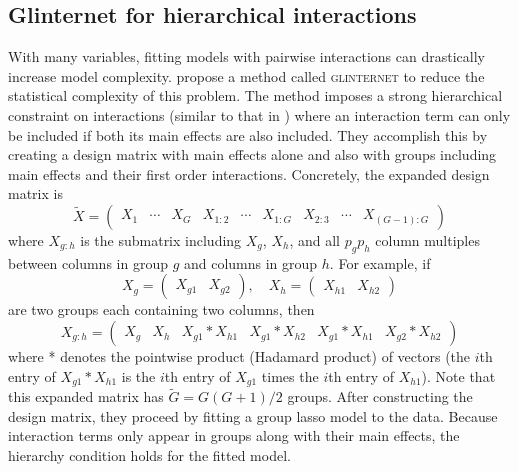 \documentclass{imsart}
\begin{document}
\subsection{Glinternet for hierarchical interactions}
\label{sec:glint}
With many variables, fitting models with pairwise interactions can drastically increase model complexity. \cite{glint} propose a method called \textsc{glinternet} to reduce the statistical complexity of this problem. The method imposes a strong hierarchical constraint on interactions (similar to that in \cite{bien:hierarchical}) where an interaction term can only be included if both its main effects are also included. They accomplish this by creating a design matrix with main effects alone and also with groups including main effects and their first order interactions. Concretely, the expanded design matrix is
\begin{equation}
\label{eq:glintmat}
\tilde X = \begin{pmatrix} X_1 & \cdots & X_G & X_{1:2} & \cdots & X_{1:G} & X_{2:3} & \cdots & X_{(G-1):G}  \end{pmatrix}
\end{equation}
where $X_{g:h}$ is the submatrix including $X_g$, $X_h$, and all
$p_gp_h$  column multiples between columns in group $g$ and columns
in group $h$. For example, if
\[
X_g = \begin{pmatrix} X_{g1} & X_{g2} \end{pmatrix}, \quad
X_h = \begin{pmatrix} X_{h1} & X_{h2} \end{pmatrix}
\]
are two groups each containing two columns, then
\[
X_{g:h} = \begin{pmatrix} X_g & X_h & X_{g1} * X_{h1} & X_{g1} * X_{h2} & X_{g1} * X_{h1} & X_{g2} * X_{h2} \end{pmatrix}
\]
where * denotes the pointwise product (Hadamard product) of vectors (the $i$th entry of $X_{g1} * X_{h1}$ is the $i$th entry of $X_{g1}$ times the $i$th entry of $X_{h1}$). Note that this expanded matrix has $\tilde G = G(G+1)/2$ groups.
After constructing the design matrix, they proceed by
fitting a group lasso model to the data. Because interaction terms only
appear in groups along with their main effects, the hierarchy condition
holds for the fitted model. 
\end{document}

